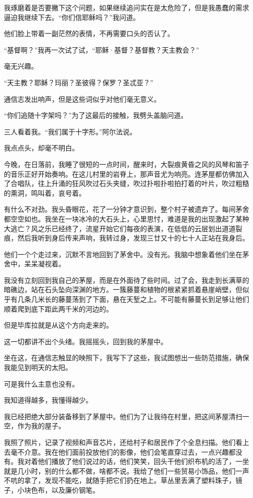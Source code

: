 \documentclass[AutoFakeBold=true]{book}
\begin{document}
我琢磨着是否要撇下这个问题，如果继续追问实在是太危险了，但是我愚蠢的需求逼迫我继续下去。``你们信耶稣吗？''我问道。

他们脸上带着一副茫然的表情，不再需要口头的否认了。

``基督啊？''我再一次试了试，``耶稣·基督？基督教？天主教会？''

毫无兴趣。

``天主教？耶稣？玛丽？圣彼得？保罗？圣忒亚？''

通信志发出响声，但是这些词似乎对他们毫无意义。

``你们追随十字架吗？''为了这最后的接触，我劈头盖脑问道。

三人看着我。``我们属于十字形。''阿尔法说。

我点点头，却毫不明白。

今晚，在日落前，我睡了很短的一点时间，醒来时，大裂痕黄昏之风的风琴和笛子的音乐正好开始奏响。在这儿村里的岩脊上，那声音尤为响亮。连茅屋都仿佛加入了合唱队，往上升涌的狂风吹过石头夹缝，吹过扑啦扑啦拍打着的叶片，吹过粗糙的熏洞，鸣叫着，哀号着。

有什么不对劲。我头昏眼花，花了一分钟才意识到，整个村子被遗弃了。每间茅舍都空空如也。我坐在一块冰冷的大石头上，心里思忖，难道是我的出现激起了某种大逃亡？风之乐已经终了，流星开始它们每夜的表演，在低低的云层划出道道裂痕，然后我听到身后传来声响，我转过身，发现三廿又十的七十人正站在我身后。

他们一个个走过来，沉默不言地回到了茅舍中。没有光。我脑中想象着他们坐在茅舍中，呆呆凝视着。

我没有立刻回到我自己的茅屋，而是在外面待了些时间。过了会，我走到长满草的暗礁边，站在石头坠向深渊的地方。一簇藤蔓和植物的根紧紧抓着悬崖峭壁，但似乎有几条几米长的藤蔓荡到了下面，悬在天堑之上。不可能有藤蔓长到足够让他们顺着爬到底下距此两千米的河边的。

但是毕库拉就是从这个方向走来的。

这一切都讲不出个头绪。我摇摇头，回到我的茅屋中。

坐在这，在通信志触显的映照下，我写下了这些，我试图想出一些防范措施，确保我能见到明天的太阳。

可是我什么主意也没有。

\vspace*{1em}{\kaishu 第一百零三日：}

我知道得越多，我懂得越少。

我已经把绝大部分装备移到了茅屋中。他们为了让我待在村里，把这间茅屋清扫一空，作为我的屋子。

我照了照片，记录了视频和声音芯片，还给村子和居民作了个全息扫描。他们看上去毫不介意。我在他们面前投放他们的影像，他们会笔直穿过去，一点兴趣都没有。我对着他们播放了他们说过的话，他们笑笑，回头干他们织布机的活了，一坐就是几小时，别的什么都不做，啥都不说。我给了他们一些贸易小饰品，他们一声不吭的拿了，发现不能吃，就随手把它们扔在地上。草丛里丢满了塑料珠子，镜子，小块色布，以及廉价钢笔。
\end{document}
